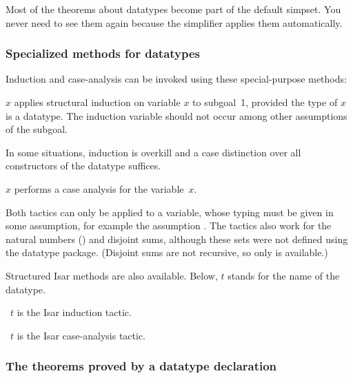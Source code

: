 Most of the theorems about datatypes become part of the default simpset.  You
never need to see them again because the simplifier applies them
automatically.  

\subsubsection{Specialized methods for datatypes}

Induction and case-analysis can be invoked using these special-purpose
methods:
\begin{ttdescription}
\item[\methdx{induct_tac} $x$] applies structural
  induction on variable $x$ to subgoal~1, provided the type of $x$ is a
  datatype.  The induction variable should not occur among other assumptions
  of the subgoal.
\end{ttdescription}
% 
In some situations, induction is overkill and a case distinction over all
constructors of the datatype suffices.
\begin{ttdescription}
\item[\methdx{Inductive.case_tac} $x$]
 performs a case analysis for the variable~$x$.
\end{ttdescription}

Both tactics can only be applied to a variable, whose typing must be given in
some assumption, for example the assumption .  The tactics
also work for the natural numbers () and disjoint sums, although
these sets were not defined using the datatype package.  (Disjoint sums are
not recursive, so only  is available.)

Structured Isar methods are also available. Below, $t$ 
stands for the name of the datatype.
\begin{ttdescription}
\item[\methdx{induct} \isa{set:}\ $t$] is the Isar induction tactic.
\item[\methdx{cases} \isa{set:}\ $t$] is the Isar case-analysis tactic.
\end{ttdescription}


\subsubsection{The theorems proved by a datatype declaration}

